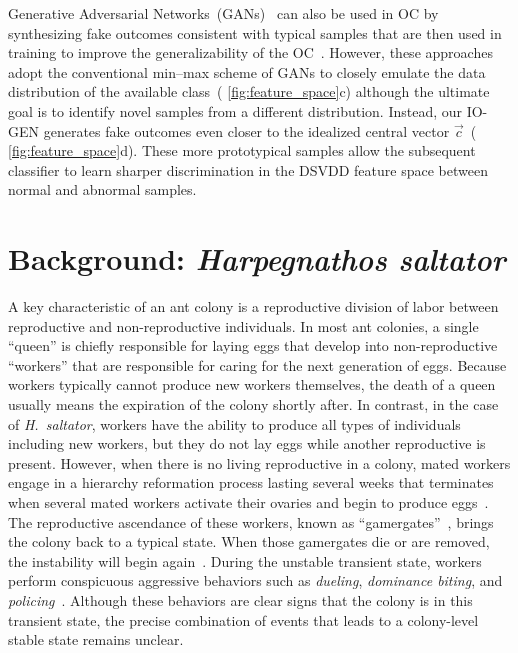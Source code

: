 \documentclass[letterpaper]{article} %
\let\orgautoref\autoref
\renewcommand{\autoref}
{\def\equationautorefname{Equation}%
\def\figureautorefname{Fig.}%
\def\subfigureautorefname{Fig.}%
\def\Itemautorefname{item}%
\def\tableautorefname{Table}%
\def\exerciseautorefname{Exercise}%
\def\starexerciseautorefname{Exercise}%
\def\sectionautorefname{Section}%
\def\subsectionautorefname{Section}%
\def\subsubsectionautorefname{Section}%
\def\chapterautorefname{Section}%
\def\partautorefname{Part}%
\orgautoref}
\begin{document}
Generative Adversarial Networks~(GANs)~\citep{GPMXWOCB14} can also be
used in OC by synthesizing fake outcomes consistent with typical samples
that are then used in training to improve the generalizability of the
OC~\citep{SKFA18, YCR20, PNX19}. However, these approaches adopt the
conventional min--max scheme of GANs to closely emulate the data
distribution of the available class~(\autoref{fig:feature_space}c)
although the ultimate goal is to identify novel samples from a different
distribution. Instead, our \mbox{IO-GEN} generates fake outcomes even closer to
the idealized central vector $\vec{c}$~(\autoref{fig:feature_space}d).
These more prototypical samples allow the subsequent classifier to learn
sharper discrimination in the DSVDD feature space between normal and
abnormal samples.




\section{Background: \emph{Harpegnathos saltator}}
\label{sec:background}

A key characteristic of an ant colony is a reproductive division of
labor between reproductive and non-reproductive individuals.
In most ant colonies, a single ``queen'' is chiefly responsible for
laying eggs that develop into non-reproductive ``workers'' that
are responsible for caring for the next generation of eggs.
Because workers typically cannot produce
new workers themselves, the death of a queen usually means the
expiration of the colony shortly after.
In contrast, in the case of \emph{H.~saltator}, workers
have the ability to produce all types of individuals including new
workers,
but they do not lay eggs while another
reproductive is present. However, when there is no living reproductive
in a colony, mated workers engage in a hierarchy reformation process
lasting several weeks that terminates when several mated workers activate
their ovaries and begin to produce eggs~\citep{LPH99, SPSHPL16}. The
reproductive ascendance of these workers, known as
``gamergates''~\citep{PC85}, brings the colony back to a typical state.
When those gamergates die or are removed, the instability will begin
again~\citep{LPH99, SPSHPL16}.
During the unstable transient state, workers perform conspicuous aggressive
behaviors such as \emph{dueling}, \emph{dominance biting}, and
\emph{policing}~\citep{SPSHPL16}.
Although these behaviors are clear signs that the colony is in
this transient state, the precise combination of events that
leads to a colony-level stable state remains unclear.
\end{document}
